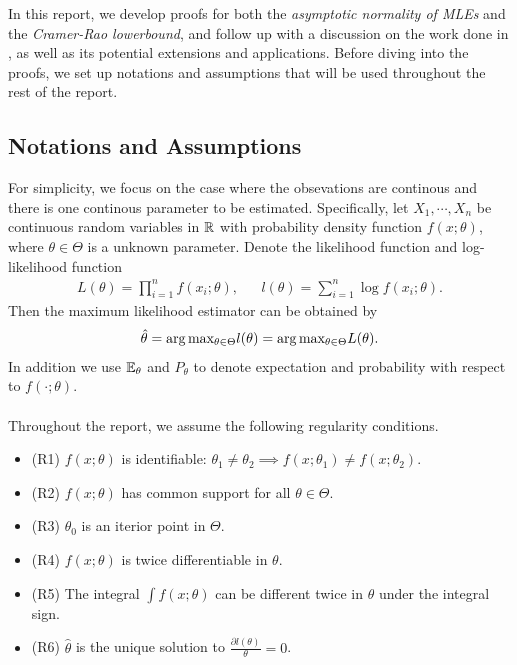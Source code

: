 In this report, we develop proofs for both the \emph{asymptotic normality of MLEs} and the \emph{Cramer-Rao lowerbound}, and follow up with a discussion on the work done in \cite{anastasiou2015bounds}, as well as its potential extensions and applications. Before diving into the proofs, we set up notations and assumptions that will be used throughout the rest of the report.
\subsection{Notations and Assumptions}
For simplicity, we focus on the case where the obsevations are continous and there is one continous parameter to be estimated. Specifically, let $X_1,\cdots,X_n$ be \iid continuous random variables in $\mathbb{R}$ with probability density function $f(x;\theta)$, where $\theta \in \Theta$ is a unknown parameter. Denote the likelihood function and log-likelihood function
\begin{align*}
L(\theta) = \prod_{i=1}^n f(x_i;\theta), && l(\theta) = \sum_{i=1}^n \log f(x_i;\theta).
\end{align*}
Then the maximum likelihood estimator can be obtained by
\begin{align*}
\hat{\theta} = \arg\text{max}_{\theta\in\Theta}l(\theta) = \arg\text{max}_{\theta\in\Theta}L(\theta).
\end{align*}
In addition we use $\mathbb{E}_{\theta}$ and $P_{\theta}$ to denote expectation and probability with respect to $f(\cdot;\theta)$.\\\\
Throughout the report, we assume the following regularity conditions.
\begin{itemize}
\item (R1) $f(x;\theta)$ is identifiable: $\theta_1\neq\theta_2\implies f(x;\theta_1)\neq f(x;\theta_2)$.
\item (R2) $f(x;\theta)$ has common support for all $\theta\in\Theta$.
\item (R3) $\theta_0$ is an iterior point in $\Theta$.
\item (R4) $f(x;\theta)$ is twice differentiable in $\theta$.
\item (R5) The integral $\int f(x;\theta)$ can be different twice in $\theta$ under the integral sign.
\item (R6) $\hat{\theta}$ is the unique solution to $\frac{\partial l(\theta)}{\theta} = 0$.
\end{itemize}
